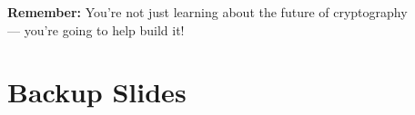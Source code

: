 \documentclass[aspectratio=169,10pt]{beamer}
\newcommand{\teaching}[1]{}
\theoremstyle{plain}
\begin{document}
\begin{frame}
  \vspace{0.5cm}
  
  \begin{center}
    \large
    \textbf{Remember:} You're not just learning about the future of cryptography\\
    --- you're going to help build it!
  \end{center}
  
  \teaching{Open dialogue, gauge understanding, inspire action}
\end{frame}


\section*{Backup Slides}
\end{document}
